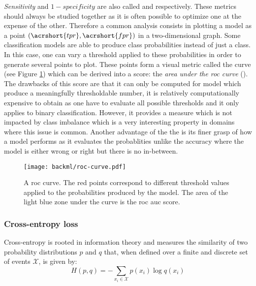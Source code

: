 \textit{Sensitivity} and $1 - \textit{specificity}$ are also called 
and  respectively. These metrics should always be studied together
as it is often possible to optimize one at the expense of the other. Therefore a
common analysis consists in plotting a model as a point $(\acrshort{tpr}, \acrshort{fpr})$
in a two-dimensional graph. Some classification models are able to produce class
probabilities instead of just a class. In this case, one can vary a threshold
applied to these probabilities in order to generate several points to plot. These
points form a visual metric called the  curve (see Figure
\ref{fig:backml:roc-curve}) which can be derived into a score: the
\textit{area under the \acrshort{roc} curve} (\rocauc). The drawbacks of this
score are that it can only be computed for model which produce a meaningfully
thresholdable number, it is relatively computationally expensive to obtain as one
have to evaluate all possible thresholds and it only applies to binary classification.
However, it provides a measure which is not impacted by class imbalance which is
a very interesting property in domains where this issue is common. Another advantage
of the the \rocaucs is its finer grasp of how a model performs as it evaluates
the probablities unlike the accuracy where the model is either wrong or right but
there is no in-between.

\begin{figure}
  \centering
  \texttt{[image: backml/roc-curve.pdf]}
  \caption{A \acrshort{roc} curve. The red points correspond to different threshold values applied to the probabilities produced by the model. The area of the light blue zone under the curve is the \acrshort{roc} \acrshort{auc} score.}
  \label{fig:backml:roc-curve}
\end{figure}


\subsubsection{Cross-entropy loss}
\label{sssec:backml:metric:crossentropy}

Cross-entropy is rooted in information theory and measures the similarity of two
probability distributions $p$ and $q$ that, when defined over a finite and discrete
set of events $\mathcal{X}$, is given by:
\begin{equation}
\label{eqn:backml:crossentropy}
H(p, q) = - \sum\limits_{x_i \in \mathcal{X}} p\left(x_i\right) \log q\left(x_i\right)
\end{equation}

